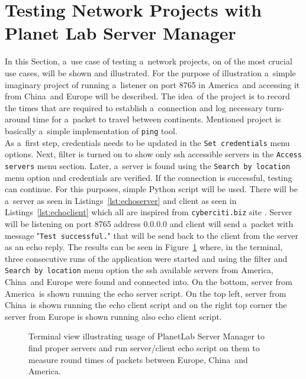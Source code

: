 {{{{{{{\section{Testing Network Projects with Planet Lab Server Manager}
\label{section:testing}
In this Section, a~use case of testing a~network projects, on of the most crucial use cases, will be shown and illustrated. For the purpose of illustration a~simple imaginary project of running a~listener on port 8765 in America~and accessing it from China~and Europe will be described. The idea~of the project is to record the times that are required to establish a~connection and log necessary turn-around time for a~packet to travel between continents. Mentioned project is basically a~simple implementation of \texttt{ping} tool.\\
As a~first step, credentials needs to be updated in the \texttt{Set credentials} menu options. Next, filter is turned on to show only ssh accessible servers in the \texttt{Access servers} menu section. Later, a~server is found using the \texttt{Search by location} menu option and credentials are verified. If the connection is successful, testing can continue. For this purposes, simple Python script will be used. There will be a~server as seen in Listings~\ref{lst:echoserver} and client as seen in Listings~\ref{lst:echoclient} which all are inspired from \texttt{cyberciti.biz} site \cite{ports}. Server will be listening on port 8765 address 0.0.0.0 and client will send a~packet with message "\texttt{Test successful.}" that will be send back to the client from the server as an echo reply. The results can be seen in Figure~\ref{fig:testingusecase} where, in the terminal, three consecutive runs of the application were started and using the filter and \texttt{Search by location} menu option the ssh available servers from America, China~and Europe were found and connected into. On the bottom, server from America~is shown running the echo server script. On the top left, server from China~is shown running the echo client script and on the right top corner the server from Europe is shown running also echo client script. 

\begin{figure}[H]
	\centering
	\caption{Terminal view illustrating usage of PlanetLab Server Manager to find proper servers and run server/client echo script on them to measure round times of packets between Europe, China~and America.}
	\label{fig:testingusecase}
\end{figure}

}}}}}}}

